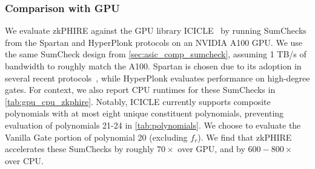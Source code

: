 \subsubsection{Comparison with GPU}
\label{sec:gpu_comparison}
We evaluate zkPHIRE against the GPU library ICICLE~\cite{icicle} by running SumChecks from the Spartan and HyperPlonk protocols on an NVIDIA A100 GPU. 
We use the same SumCheck design from \autoref{sec:asic_comp_sumcheck}, assuming 1 TB/s of bandwidth to roughly match the A100.
Spartan is chosen due to its adoption in several recent protocols~\cite{jolt, kwan2024verifying, nova}, while HyperPlonk evaluates performance on high-degree gates.
For context, we also report CPU runtimes for these SumChecks in \autoref{tab:gpu_cpu_zkphire}.
Notably, ICICLE currently supports composite polynomials with at most eight unique constituent polynomials, preventing evaluation of polynomials 21-24 in \autoref{tab:polynomials}. We choose to evaluate the Vanilla Gate portion of polynomial 20 (excluding $f_r$).
We find that zkPHIRE accelerates these SumChecks by roughly $70\times$ over GPU, and by $600-800\times$ over CPU. 



